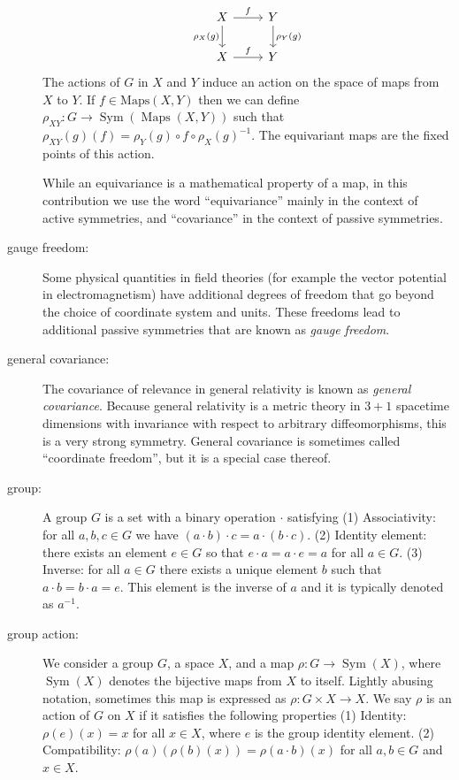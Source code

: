 \documentclass[preprint]{article} %
\begin{document}
\begin{description}
\begin{equation}
\begin{tikzcd}[every label/.append ]
  {X}\arrow[r, "f"] \arrow[d,"\rho_X(g)",swap] & {Y}  \arrow[d,"\rho_Y(g)"]\\
{X} \arrow[r, "f"]  & {Y} 
\end{tikzcd}
\end{equation}
The actions of $G$ in $X$ and $Y$ induce an action on the space of maps from $X$ to $Y$. If $f\in \text{Maps}(X,Y)$ then we can define $\rho_{XY}: G \to \operatorname{Sym}(\operatorname{Maps}(X,Y))$ such that $\rho_{XY}(g)(f) = \rho_Y(g)\circ f \circ \rho_X(g)^{-1}$.
The equivariant maps are the fixed points of this action.

While an equivariance is a mathematical property of a map, in this contribution we use the word ``equivariance'' mainly in the context of active symmetries, and ``covariance'' in the context of passive symmetries.
\item[gauge freedom:]
Some physical quantities in field theories (for example the vector potential in electromagnetism) have additional degrees of freedom that go beyond the choice of coordinate system and units.
These freedoms lead to additional passive symmetries that are known as \emph{gauge freedom}.
\item[general covariance:]
The covariance of relevance in general relativity \citep{einstein} is known as \emph{general covariance}.
Because general relativity is a metric theory in $3+1$ spacetime dimensions with invariance with respect to arbitrary diffeomorphisms, this is a very strong symmetry.
General covariance is sometimes called ``coordinate freedom'', but it is a special case thereof.
\item[group:] A group $G$ is a set with a binary operation $\cdot$ satisfying (1) Associativity: for all $a,b,c\in G$ we have $(a\cdot b) \cdot c = a \cdot (b\cdot c)$. (2) Identity element: there exists an element $e\in G$ so that $e\cdot a = a \cdot e = a$ for all $a\in G$. (3) Inverse: for all $a \in G$ there exists a unique element $b$ such that $a\cdot b = b\cdot a = e$. This element is the inverse of $a$ and it is typically denoted as $a^{-1}$.
\item[group action:] We consider a group $G$, a space $X$, and a map $\rho: G \to \operatorname{Sym}(X)$, where $\operatorname{Sym}(X)$ denotes the bijective maps from $X$ to itself. Lightly abusing notation, sometimes this map is expressed as $\rho:G\times X \to X$. We say $\rho$ is an action of $G$ on $X$ if it satisfies the following properties (1) Identity: $\rho(e)(x)=x$ for all $x\in X$, where $e$ is the group identity element. (2) Compatibility: $\rho(a)( \rho(b)(x))=\rho (a\cdot b)( x)$ for all $a,b\in G$ and $x\in X$.

\end{description}
\end{document}
